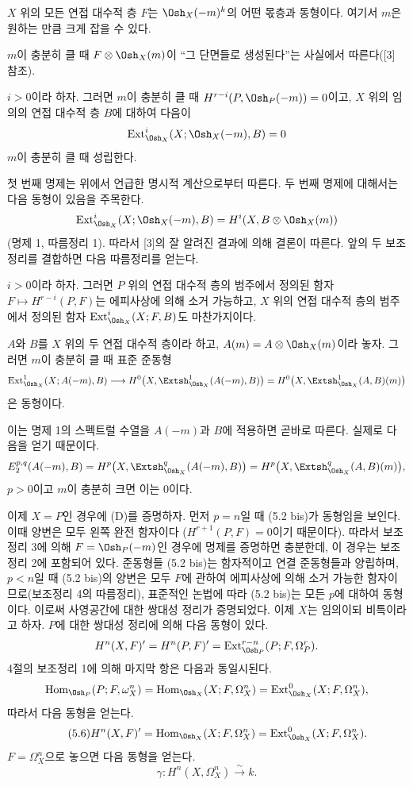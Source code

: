  $X$ 위의 모든 연접 대수적 층 $F$는
$\Osh_X(-m)^{k}$의 어떤 몫층과 동형이다. 여기서 $m$은 원하는 만큼
크게 잡을 수 있다.

$m$이 충분히 클 때 $F\otimes\Osh_X(m)$이 ``그 단면들로 생성된다''는
사실에서 따른다([3] 참조).

 $i>0$이라 하자. 그러면
$m$이 충분히 클 때 $H^{r-i}(P,\Osh_P(-m))=0$이고, $X$ 위의 임의의
연접 대수적 층 $B$에 대하여 다음이
\[
  \operatorname{Ext}_{\Osh_X}^{i}(X;\Osh_X(-m),B)=0
\]
$m$이 충분히 클 때 성립한다.

첫 번째 명제는 위에서 언급한 명시적 계산으로부터 따른다. 두 번째 명제에
대해서는 다음 동형이 있음을 주목한다.
\[
  \operatorname{Ext}_{\Osh_X}^{i}(X;\Osh_X(-m),B)
  =H^{i}(X,B\otimes\Osh_X(m))
\]
(명제 1, 따름정리 1). 따라서 [3]의 잘 알려진 결과에 의해 결론이
따른다. 앞의 두 보조정리를 결합하면 다음 따름정리를 얻는다.

 $i>0$이라 하자. 그러면 $P$ 위의 연접 대수적 층의
범주에서 정의된 함자 $F\longmapsto H^{r-i}(P,F)$는 에피사상에 의해
소거 가능하고, $X$ 위의 연접 대수적 층의 범주에서 정의된 함자
$\operatorname{Ext}_{\Osh_X}^{i}(X;F,B)$도 마찬가지이다.

 $A$와 $B$를 $X$ 위의 두 연접 대수적 층이라 하고,
$A(m)=A\otimes\Osh_X(m)$이라 놓자. 그러면 $m$이 충분히 클 때 표준
준동형
\[
  \operatorname{Ext}_{\Osh_X}^{1}(X;A(-m),B)
  \longrightarrow H^{0}\bigl(X,\Extsh_{\Osh_X}^{1}(A(-m),B)\bigr)
  =H^{0}\bigl(X,\Extsh_{\Osh_X}^{1}(A,B)(m)\bigr)
\]
은 동형이다.

이는 명제 1의 스펙트럴 수열을 $A(-m)$과 $B$에 적용하면 곧바로 따른다.
실제로 다음을 얻기 때문이다.
\[
  E_{2}^{p,q}(A(-m),B)
  =H^{p}\bigl(X,\Extsh_{\Osh_X}^{q}(A(-m),B)\bigr)
  =H^{p}\bigl(X,\Extsh_{\Osh_X}^{q}(A,B)(m)\bigr),
\]
$p>0$이고 $m$이 충분히 크면 이는 0이다.

이제 $X=P$인 경우에 (D)를 증명하자. 먼저 $p=n$일 때 (5.2 bis)가
동형임을 보인다. 이때 양변은 모두 왼쪽 완전 함자이다
($H^{r+1}(P,F)=0$이기 때문이다). 따라서 보조정리 3에 의해
$F=\Osh_P(-m)$인 경우에 명제를 증명하면 충분한데, 이 경우는
보조정리 2에 포함되어 있다. 준동형들 (5.2 bis)는 함자적이고
연결 준동형들과 양립하며, $p<n$일 때 (5.2 bis)의 양변은 모두
$F$에 관하여 에피사상에 의해 소거 가능한 함자이므로(보조정리 4의 따름정리),
표준적인 논법에 따라 (5.2 bis)는 모든 $p$에 대하여 동형이다.
이로써 사영공간에 대한 쌍대성 정리가 증명되었다. 이제 $X$는 임의이되
비특이라고 하자. $P$에 대한 쌍대성 정리에 의해 다음 동형이 있다.
\[
  H^{n}(X,F)'=H^{n}(P,F)'
  =\operatorname{Ext}_{\Osh_P}^{r-n}(P;F,\Omega_P^{r}).
\]
4절의 보조정리 1에 의해 마지막 항은 다음과 동일시된다.
\[
  \operatorname{Hom}_{\Osh_P}(P;F,\omega_X^{n})
  =\operatorname{Hom}_{\Osh_X}(X;F,\Omega_X^{n})
  =\operatorname{Ext}_{\Osh_X}^{0}(X;F,\Omega_X^{n}),
\]
따라서 다음 동형을 얻는다.
\begin{equation}\tag{5.6}
  H^{n}(X,F)'=\operatorname{Hom}_{\Osh_X}(X;F,\Omega_X^{n})
  =\operatorname{Ext}_{\Osh_X}^{0}(X;F,\Omega_X^{n}).
\end{equation}
$F=\Omega_X^{n}$으로 놓으면 다음 동형을 얻는다.
\begin{equation}\tag{5.7}
  \gamma:H^{n}(X,\Omega_X^{n})\xrightarrow{\sim}k.
\end{equation}

